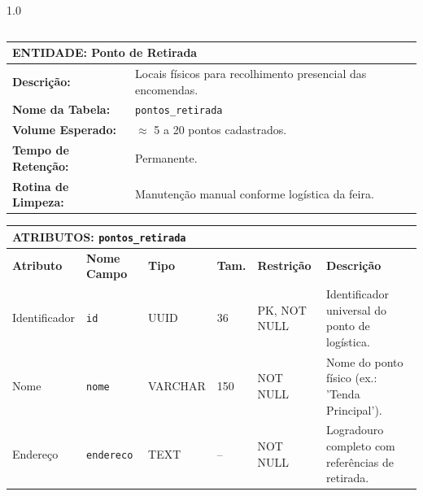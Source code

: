\documentclass[12pt,a4paper]{article}
\begin{document}
\begin{spacing}{1.0}
\begin{tabularx}{\textwidth}{|p{1.6cm}|p{1.9cm}|p{1.2cm}|p{0.7cm}|p{1.9cm}|X|}
\end{tabularx}

\vspace{0.6cm}

\noindent

\begin{tabularx}{\textwidth}{|p{3.0cm}|X|}

\hline

\multicolumn{2}{|l|}{\textbf{ENTIDADE: Ponto de Retirada}} \\ \hline

\textbf{Descrição:} & Locais físicos para recolhimento presencial das encomendas. \\ \hline

\textbf{Nome da Tabela:} & \texttt{pontos\_retirada} \\ \hline

\textbf{Volume Esperado:} & $\approx$ 5 a 20 pontos cadastrados. \\ \hline

\textbf{Tempo de Retenção:} & Permanente. \\ \hline

\textbf{Rotina de Limpeza:} & Manutenção manual conforme logística da feira. \\ \hline

\end{tabularx}

\vspace{0.25cm}

\noindent

\begin{tabularx}{\textwidth}{|p{1.6cm}|p{1.9cm}|p{1.2cm}|p{0.7cm}|p{1.9cm}|X|}

\hline

\multicolumn{6}{|l|}{\textbf{ATRIBUTOS: \texttt{pontos\_retirada}}} \\ \hline

\textbf{Atributo} & \textbf{Nome Campo} & \textbf{Tipo} & \textbf{Tam.} & \textbf{Restrição} & \textbf{Descrição} \\ \hline

Identificador & \texttt{id} & UUID & 36 & PK, NOT NULL & Identificador universal do ponto de logística. \\ \hline

Nome & \texttt{nome} & VARCHAR & 150 & NOT NULL & Nome do ponto físico (ex.: 'Tenda Principal'). \\ \hline

Endereço & \texttt{endereco} & TEXT & -- & NOT NULL & Logradouro completo com referências de retirada. \\ \hline

\end{tabularx}

\end{spacing}
\end{document}

